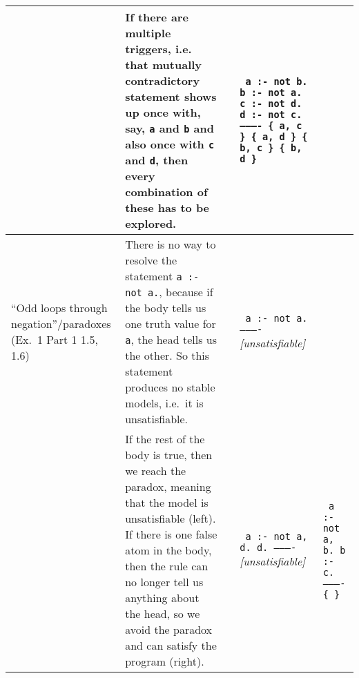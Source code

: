 \documentclass[10pt,a4paper,landscape]{article}
\begin{document}
\begin{longtable}{Lp{13.5cm}lXX}
		& If there are multiple triggers, i.e. that mutually contradictory statement shows up once with, say, \texttt{a} and \texttt{b} and also once with \texttt{c} and \texttt{d}, then every combination of these has to be explored.
		&& \texttt{%
			a :- not b. \newline
			b :- not a. \newline
			c :- not d. \newline
			d :- not c. \newline
			---------- \newline
			\{ a, c \} \newline
			\{ a, d \} \newline
			\{ b, c \} \newline
			\{ b, d \}}
		&\\ \midrule
	
	``Odd loops \newline through negation''\slash \newline paradoxes \newline (Ex.\ 1 Part 1  1.5, 1.6)
		& There is no way to resolve the statement \texttt{a :- not a.}, because if the body tells us one truth value for \texttt{a}, the head tells us the other.
		So this statement produces no stable models, i.e.\ it is unsatisfiable.		
		&& \texttt{%
			a :- not a. \newline
			---------- \newline}
			\textit{[unsatisfiable]}
		& \\ %
		
		& If the rest of the body is true, then we reach the paradox, meaning that the model is unsatisfiable (left).
		If there is one false atom in the body, then the rule can no longer tell us anything about the head, so we avoid the paradox and can satisfy the program (right).
		&& \texttt{%
			a :- not a, d. \newline
			d. \newline
			---------- \newline}
			\textit{[unsatisfiable]}
		& \texttt{%
			a :- not a, b. \newline
			b :- c. \newline
			---------- \newline
			\{ \} } \\ \midrule


\end{longtable}
\end{document}
